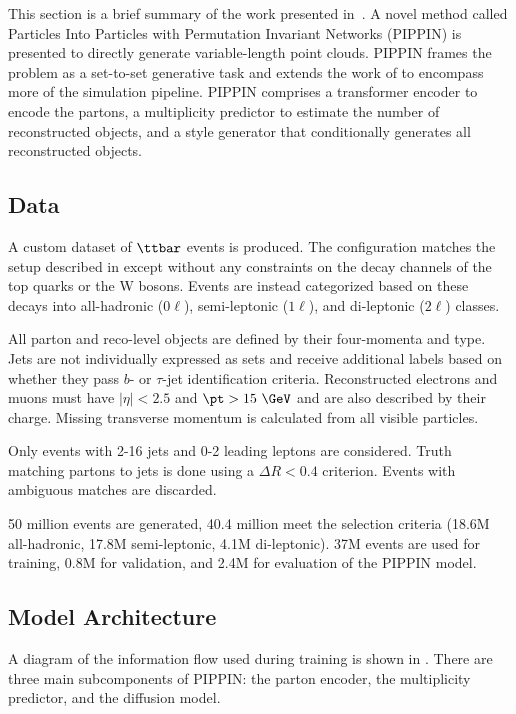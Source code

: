 This section is a brief summary of the work presented in~\textcite{PIPPIN}.
A novel method called Particles Into Particles with Permutation Invariant Networks (PIPPIN) is presented to directly generate variable-length point clouds.
PIPPIN frames the problem as a set-to-set generative task and extends the work of \pcdroid to encompass more of the simulation pipeline.
PIPPIN comprises a transformer encoder to encode the partons, a multiplicity predictor to estimate the number of reconstructed objects, and a \pcdroid style generator that conditionally generates all reconstructed objects.

\subsection{Data}

A custom dataset of $\ttbar$ events is produced.
The configuration matches the setup described in  except without any constraints on the decay channels of the top quarks or the W bosons.
Events are instead categorized based on these decays into all-hadronic ($0\ell$), semi-leptonic ($1\ell$), and di-leptonic ($2\ell$) classes.

All parton and reco-level objects are defined by their four-momenta and type.
Jets are not individually expressed as sets and receive additional labels based on whether they pass $b$- or $\tau$-jet identification criteria.
Reconstructed electrons and muons must have $|\eta| < 2.5$ and $\pt > 15~\GeV$ and are also described by their charge.
Missing transverse momentum \ptmiss is calculated from all visible particles.

Only events with 2-16 jets and 0-2 leading leptons are considered.
Truth matching partons to jets is done using a $\Delta R < 0.4$ criterion.
Events with ambiguous matches are discarded.

50 million events are generated, 40.4 million meet the selection criteria (18.6M all-hadronic, 17.8M semi-leptonic, 4.1M di-leptonic).
37M events are used for training, 0.8M for validation, and 2.4M for evaluation of the PIPPIN model.

\subsection{Model Architecture}

A diagram of the information flow used during training is shown in .
There are three main subcomponents of PIPPIN: the parton encoder, the multiplicity predictor, and the diffusion model.

